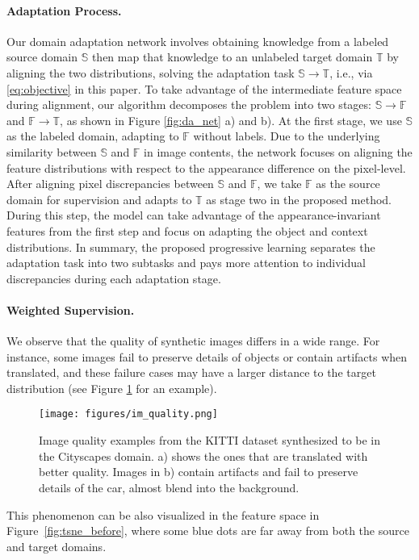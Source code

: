 \documentclass[10pt,twocolumn,letterpaper]{article}
\begin{document}
\vspace{-2mm}\paragraph{Adaptation Process.}
Our domain adaptation network involves obtaining knowledge from a labeled source domain $\mathbb{S}$ then map that knowledge to an unlabeled target domain $\mathbb{T}$ by aligning the two distributions, solving the adaptation task $\mathbb{S} \rightarrow \mathbb{T}$, i.e., via \eqref{eq:objective} in this paper.
To take advantage of the intermediate feature space during alignment, our algorithm decomposes the problem into two stages: $\mathbb{S} \rightarrow \mathbb{F}$ and $\mathbb{F} \rightarrow \mathbb{T}$, as shown in Figure \ref{fig:da_net} a) and b).
At the first stage, we use $\mathbb{S}$ as the labeled domain, adapting to $\mathbb{F}$ without labels.
Due to the underlying similarity between $\mathbb{S}$ and $\mathbb{F}$ in image contents, the network focuses on aligning the feature distributions with respect to the appearance difference on the pixel-level.
After aligning pixel discrepancies between $\mathbb{S}$ and $\mathbb{F}$, we take $\mathbb{F}$ as the source domain for supervision and adapts to $\mathbb{T}$ as stage two in the proposed method.
During this step, the model can take advantage of the appearance-invariant features from the first step and focus on adapting the object and context distributions.
In summary, the proposed progressive learning separates the adaptation task into two subtasks and pays more attention to individual discrepancies during each adaptation stage.

\vspace{-2mm}\paragraph{Weighted Supervision.}
We observe that the quality of synthetic images differs in a wide range.
For instance, some images fail to preserve details of objects or contain artifacts when translated, and these failure cases may have a larger distance to the target distribution (see Figure \ref{fig:im_quality} for an example).
\begin{figure}
		\begin{center}
        \texttt{[image: figures/im\_quality.png]}
		\end{center}
		\caption{
		Image quality examples from the KITTI dataset synthesized to be in the Cityscapes domain.
a) shows the ones that are translated with better quality.
Images in b) contain artifacts and fail to preserve details of the car, almost blend into the background.
}
		\label{fig:im_quality}
\vspace{-3mm}
\end{figure}
This phenomenon can be also visualized in the feature space in Figure~\ref{fig:tsne_before}, where some blue dots are far away from both the source and target domains.
\end{document}
